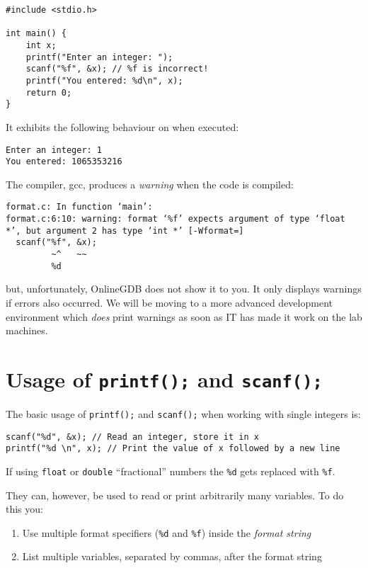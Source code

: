 \documentclass{lab}
\begin{document}
\begin{lstlisting}[style=CStyle]
#include <stdio.h>

int main() {
	int x;
	printf("Enter an integer: ");
	scanf("%f", &x); // %f is incorrect!
	printf("You entered: %d\n", x); 
	return 0;
}
\end{lstlisting}

It exhibits the following behaviour on when executed:

\begin{lstlisting}[style=pseudo]
Enter an integer: 1
You entered: 1065353216
\end{lstlisting}

The compiler, gcc, produces a \textit{warning} when the code is compiled:

\begin{lstlisting}[style=CStyle]
format.c: In function ‘main’:
format.c:6:10: warning: format ‘%f’ expects argument of type ‘float *’, but argument 2 has type ‘int *’ [-Wformat=]
  scanf("%f", &x);
         ~^   ~~
         %d
\end{lstlisting}

but, unfortunately, OnlineGDB does not show it to you. It only displays warnings if errors also occurred. We will be moving to a more advanced development environment which \textit{does} print warnings as soon as IT has made it work on the lab machines.


\pagebreak
\section{Usage of \texttt{printf();} and \texttt{scanf();}}

The basic usage of \texttt{printf();} and \texttt{scanf();} when working with single integers is:

\begin{lstlisting}[style=CStyle]
scanf("%d", &x); // Read an integer, store it in x
printf("%d \n", x); // Print the value of x followed by a new line
\end{lstlisting}

If using \texttt{float} or \texttt{double} ``fractional'' numbers the \texttt{\%d} gets replaced with \texttt{\%f}.

They can, however, be used to read or print arbitrarily many variables. To do this you:

\begin{enumerate}
\item Use multiple format specifiers (\texttt{\%d} and \texttt{\%f}) inside the \textit{format string}
\item List multiple variables, separated by commas, after the format string
\end{enumerate}
\end{document}
